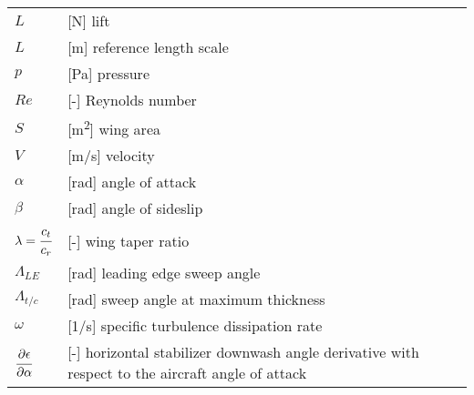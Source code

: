 \begin{longtable}[l]{ l p{} }
  $L$                                          & [N] lift \\
  $L$                                          & [m] reference length scale \\
  $p$                                          & [Pa] pressure \\
  $Re$                                         & [-] Reynolds number \\
  $S$                                          & [m\textsuperscript{2}] wing area \\
  $V$                                          & [m/s] velocity \\
  $\alpha$                                     & [rad] angle of attack \\
  $\beta$                                      & [rad] angle of sideslip \\
  $\lambda=\cfrac{c_t}{c_r}$                   & [-] wing taper ratio \\
  $\Lambda_{LE}$                               & [rad] leading edge sweep angle \\
  $\Lambda_{t/c}$                              & [rad] sweep angle at maximum thickness \\
  $\omega$                                     & [1/s] specific turbulence dissipation rate \\
  $\cfrac{\partial \epsilon}{\partial \alpha}$ & [-] horizontal stabilizer downwash angle derivative with respect to the aircraft angle of attack \\
\end{longtable}
